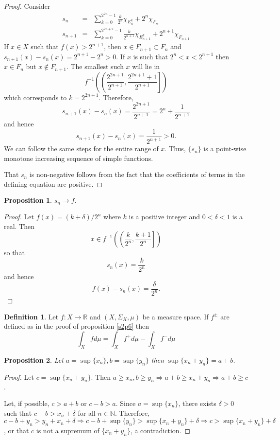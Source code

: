 \documentclass{article}
\newcommand{\sor}{\mathbb{R}}
\newcommand{\son}{\mathbb{N}}
\theoremstyle{plain}
\numberwithin{thm}{section}
\theoremstyle{plain}
\newtheorem{prop}{Proposition}
\numberwithin{prop}{section}
\theoremstyle{definition}
\newtheorem{defn}{Definition}
\numberwithin{defn}{section}
\theoremstyle{remark}
\theoremstyle{plain}
\numberwithin{cor}{section}
\numberwithin{equation}{section}
\begin{document}
\begin{proof}
Consider
\begin{eqnarray*}
s_n &=& \sum_{k=0}^{2^{2n}-1}\frac{k}{2^n}\chi_{E_n^k} + 2^n\chi_{F_n} \\
s_{n+1} &=& \sum_{k=0}^{2^{2n+2}-1}\frac{k}{2^{n+1}}\chi_{E_{n+1}^k} + 2^{n+1}\chi_{F_{n+1}}
\end{eqnarray*}
If $x \in X$ such that $f(x) > 2^{n+1}$, then $x \in F_{n+1} \subset F_n$ and 
$s_{n+1}(x) - s_n(x) = 2^{n+1} - 2^n > 0$.
If $x$ is such that $2^n < x < 2^{n+1}$ then $x \in F_n$ but $x \notin F_{n+1}$.
The smallest such $x$ will lie in
\[
f^{-1}\left(\left(\frac{2^{2n+1}}{2^{n+1}}, \frac{2^{2n+1} + 1}{2^{n+1}}\right]\right)
\]
which corresponds to $k = 2^{2n+1}$. Therefore,
\[
s_{n+1}(x) - s_n(x) = \frac{2^{2n+1}}{2^{n+1}} = 2^n + \frac{1}{2^{n+1}}
\]
and hence
\[
s_{n+1}(x) - s_n(x) = \frac{1}{2^{n+1}} > 0.
\]
We can follow the same steps for the entire range of $x$. Thus, $\{s_n\}$ is a
point-wise monotone increasing sequence of simple functions.

That $s_n$ is non-negative follows from the fact that the coefficients of terms
in the defining equation are positive.
\end{proof}

\begin{prop}\label{s3p7}
$s_n \rightarrow f$.
\end{prop}
\begin{proof}
Let $f(x) = (k + \delta)/2^n$ where $k$ is a positive integer and $0 < \delta < 1$
is a real. Then 
\[
x \in f^{-1}\left(\left(\frac{k}{2^n}, \frac{k+1}{2^n}\right]\right)
\]
so that
\[
s_n(x) = \frac{k}{2^n}
\]
and hence
\[
f(x) - s_n(x) = \frac{\delta}{2^n}.
\]
\end{proof}

\begin{defn}\label{s3d4}
Let $f:X \rightarrow \sor$ and $(X, \Sigma_X, \mu)$ be a measure space. If $f^{\pm}$
are defined as in the proof of proposition \ref{s2p6} then
\[
\int_X f d\mu = \int_X f^+ d\mu - \int_X f^-d\mu
\]
\end{defn}

\begin{prop}\label{s3p8}
Let $a = \sup\{x_n\}, b = \sup\{y_n\}$ then $\sup\{x_n + y_n\} = a + b$.
\end{prop}
\begin{proof}
Let $c = \sup\{x_n + y_n\}$. Then $a \ge x_n, b \ge y_n \Rightarrow a+ b \ge x_n + y_n
\Rightarrow a + b \ge c$. 

Let, if possible, $c > a + b$ or $c - b > a$. Since $a = \sup\{x_n\}$, there 
exists $\delta > 0$ such that $c - b > x_n + \delta$ for all $n \in \son$.
Therefore, $c - b + y_n > y_n + x_n + \delta \Rightarrow c - b + \sup\{y_n\}
> \sup\{x_n + y_n\} + \delta \Rightarrow c > \sup\{x_n + y_n\} + \delta$, or
that $c$ is not a supremum of $\{x_n + y_n\}$, a contradiction.
\end{proof}
\end{document}
